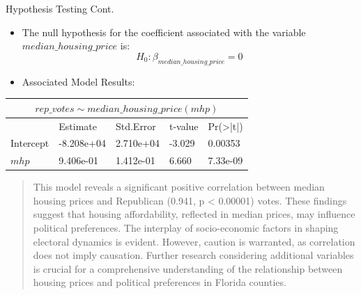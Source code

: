 \documentclass[xcolor=dvipsnames]{beamer}
\newlength{\onecolwid}
\newlength{\twocolwid}
\begin{document}
\begin{frame}[t]
\begin{columns}[t]
\begin{column}{\twocolwid}
\begin{columns}[t,totalwidth=\twocolwid]
\begin{column}{\onecolwid}

\begin{block}{Hypothesis Testing Cont.}

\begin{itemize}
\textbf{Linear Model:} 

$rep\_votes \sim median\_housing\_price$ \\ \newline
\item [\textcolor{black}{\textbullet}] The null hypothesis for the coefficient associated with the variable $median\_housing\_price$ is: \\
$$H_0: \beta_{median\_housing\_price} = 0$$
\item [\textcolor{black}{\textbullet}] Associated Model Results:

\end{itemize}    

\newline
\newline
\begin{tabular}{ |p{5.2cm}|p{5.9cm}|p{5cm}|p{4.2cm}|p{5cm}|}

 \hline
 \multicolumn{5}{|c|}{$rep\_votes \sim median\_housing\_price (mhp)$} \\
 \hline
 & Estimate &Std.Error &t-value & Pr(>|t|)\\
 \hline
 Intercept   & -8.208e+04    &2.710e+04&   -3.029  & 0.00353\\
 \hline
 $mhp$ &   9.406e-01  &1.412e-01   &6.660 & 7.33e-09\\
 \hline
\end{tabular}
\newline

\begin{quote}
\textcolor{white}{\textbullet}This model reveals a significant positive correlation between median housing prices and Republican (0.941, p < 0.00001) votes. These findings suggest that housing affordability, reflected in median prices, may influence political preferences. The interplay of socio-economic factors in shaping electoral dynamics is evident. However, caution is warranted, as correlation does not imply causation. Further research considering additional variables is crucial for a comprehensive understanding of the relationship between housing prices and political preferences in Florida counties.



\end{quote}


\end{block}
\end{column}
\end{columns}
\end{column}
\end{columns}
\end{frame}
\end{document}
